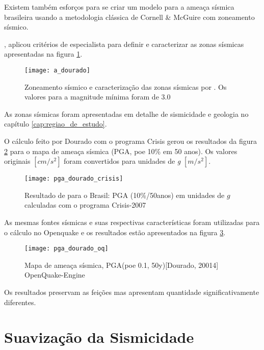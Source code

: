 Existem também esforços \citep{dourado_2014} para se criar um modelo para a ameaça sísmica brasileira
usando a metodologia clássica de Cornell \& McGuire com zoneamento sísmico. 

\citet{dourado_2014}, aplicou critérios de especialista para definir e caracterizar as zonas sísmicas
apresentadas na figura \ref{fig:a_dourado}.

\begin{figure}[H]
  \centering
  \texttt{[image: a\_dourado]} 
  \caption{Zoneamento sísmico e caracterização das zonas sísmicas por \citep{dourado_2014}.
  Os valores para a magnitude mínima foram de 3.0}
  \label{fig:a_dourado} 
\end{figure}

As zonas sísmicas foram apresentadas em detalhe de sismicidade e geologia no capítulo \ref{cap:regiao_de_estudo}.

O cálculo feito por Dourado com o programa Crisis \citep{crisis_2007} gerou os resultados da figura \ref{fig:pga_dourado}
para o mapa de ameaça sísmica (PGA, poe 10\% em 50 anos). Os valores originais  $[cm/s^2]$ foram convertidos
para unidades de \emph{g} $[m/s^2]$.

\begin{figure}[H]
  \centering
  \texttt{[image: pga\_dourado\_crisis]} 
  \caption{Resultado de \citet{dourado_2014} para o Brasil: PGA (10\%/50anos) em unidades de $g$ calculadas com o programa
  Crisis-2007}
  \label{fig:pga_dourado} 
\end{figure}

As mesmas fontes sísmicas e suas respectivas características foram utilizadas para o cálculo no
Openquake e os resultados estão apresentados na figura \ref{fig:pga_dourado_oq}.

\begin{figure}[H]
  \centering
  \texttt{[image: pga\_dourado\_oq]} 
  \caption{Mapa de ameaça sísmica, PGA(poe 0.1, 50y)[Dourado, 20014] OpenQuake-Engine }
  \label{fig:pga_dourado_oq} 
\end{figure}

Os resultados preservam as feições mas apresentam quantidade significativamente diferentes.


\section{Suavização da Sismicidade}
\label{sec:suavizacao_resultados}

